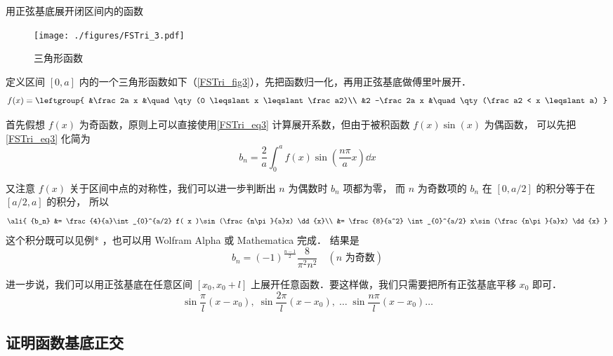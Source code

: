 \begin{example}{用正弦基底展开闭区间内的函数}

\begin{figure}[ht]
\centering
\texttt{[image: ./figures/FSTri\_3.pdf]}
\caption{三角形函数} \label{FSTri_fig3}
\end{figure}

定义区间 $[0,a]$ 内的一个三角形函数如下（\autoref{FSTri_fig3}），先把函数归一化，再用正弦基底做傅里叶展开．
\begin{equation}
f(x) = \leftgroup{
&\frac2a x &\quad \qty(0 \leqslant x \leqslant \frac a2)\\
&2 -\frac2a x &\quad \qty(\frac a2 < x \leqslant a)
}\end{equation}

首先假想 $f(x)$ 为奇函数，原则上可以直接使用\autoref{FSTri_eq3} 计算展开系数，但由于被积函数 $f(x)\sin(x)$ 为偶函数， 可以先把\autoref{FSTri_eq3} 化简为%
\begin{equation}
{b_n} = \frac{2}{a}\int_{0}^a f( x )\sin (\frac{n\pi}{a}x) \dd{x}
\end{equation}

又注意 $f(x)$ 关于区间中点的对称性，我们可以进一步判断出 $n$ 为偶数时 $b_n$ 项都为零， 而 $n$ 为奇数项的 $b_n$ 在 $[0, a/2]$ 的积分等于在 $[a/2, a]$ 的积分， 所以
\begin{equation}
\ali{
{b_n} &= \frac{4}{a}\int_{0}^{a/2} f( x )\sin (\frac{n\pi}{a}x) \dd{x}\\
&= \frac{8}{a^2} \int_{0}^{a/2} x\sin (\frac{n\pi}{a}x) \dd{x}
}\end{equation}
这个积分既可以见例*%
，也可以用 Wolfram Alpha 或 Mathematica 完成．%
结果是
\begin{equation}
b_n = (-1)^{\frac{n-1}{2}} \frac{8}{\pi^2 n^2} \quad (\text{$n$ 为奇数})
\end{equation}

\end{example}

进一步说，我们可以用正弦基底在任意区间 $[x_0,x_0+l]$ 上展开任意函数．要这样做，我们只需要把所有正弦基底平移 $x_0$ 即可．
\begin{equation}
\sin\frac{\pi}{l} (x-x_0),\;   \sin\frac{2\pi}{l} (x-x_0),\;    \dots\;\sin\frac{n\pi}{l} (x-x_0) \dots
\end{equation}

\subsection{证明函数基底正交}

